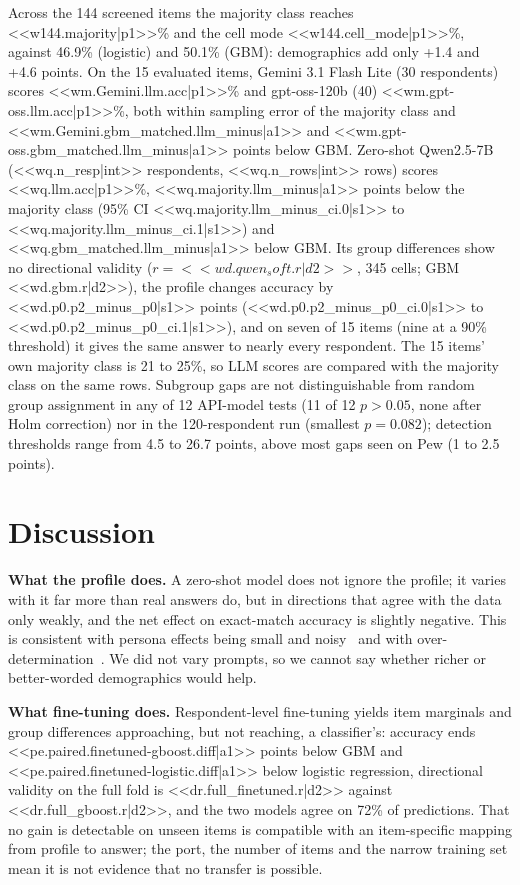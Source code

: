 \documentclass[conference]{IEEEtran}
\begin{document}
Across the 144 screened items the majority class reaches <<w144.majority|p1>>\% and the cell mode <<w144.cell_mode|p1>>\%, against 46.9\% (logistic) and 50.1\% (GBM): demographics add only +1.4 and +4.6 points. On the 15 evaluated items, Gemini 3.1 Flash Lite (30 respondents) scores <<wm.Gemini.llm.acc|p1>>\% and gpt-oss-120b (40) <<wm.gpt-oss.llm.acc|p1>>\%, both within sampling error of the majority class and <<wm.Gemini.gbm_matched.llm_minus|a1>> and <<wm.gpt-oss.gbm_matched.llm_minus|a1>> points below GBM. Zero-shot Qwen2.5-7B (<<wq.n_resp|int>> respondents, <<wq.n_rows|int>> rows) scores <<wq.llm.acc|p1>>\%, <<wq.majority.llm_minus|a1>> points below the majority class (95\% CI <<wq.majority.llm_minus_ci.0|s1>> to <<wq.majority.llm_minus_ci.1|s1>>) and <<wq.gbm_matched.llm_minus|a1>> below GBM. Its group differences show no directional validity ($r={<<wd.qwen_soft.r|d2>>}$, 345 cells; GBM <<wd.gbm.r|d2>>), the profile changes accuracy by <<wd.p0.p2_minus_p0|s1>> points (<<wd.p0.p2_minus_p0_ci.0|s1>> to <<wd.p0.p2_minus_p0_ci.1|s1>>), and on seven of 15 items (nine at a 90\% threshold) it gives the same answer to nearly every respondent. The 15 items' own majority class is 21 to 25\%, so LLM scores are compared with the majority class on the same rows. Subgroup gaps are not distinguishable from random group assignment in any of 12 API-model tests (11 of 12 $p>0.05$, none after Holm correction) nor in the 120-respondent run (smallest $p=0.082$); detection thresholds range from 4.5 to 26.7 points, above most gaps seen on Pew (1 to 2.5 points).

\section{Discussion}

\textbf{What the profile does.} A zero-shot model does not ignore the profile; it varies with it far more than real answers do, but in directions that agree with the data only weakly, and the net effect on exact-match accuracy is slightly negative. This is consistent with persona effects being small and noisy~\cite{hu2024} and with over-determination~\cite{chen2026}. We did not vary prompts, so we cannot say whether richer or better-worded demographics would help.

\textbf{What fine-tuning does.} Respondent-level fine-tuning yields item marginals and group differences approaching, but not reaching, a classifier's: accuracy ends <<pe.paired.finetuned-gboost.diff|a1>> points below GBM and <<pe.paired.finetuned-logistic.diff|a1>> below logistic regression, directional validity on the full fold is <<dr.full_finetuned.r|d2>> against <<dr.full_gboost.r|d2>>, and the two models agree on 72\% of predictions. That no gain is detectable on unseen items is compatible with an item-specific mapping from profile to answer; the port, the number of items and the narrow training set mean it is not evidence that no transfer is possible.
\end{document}
